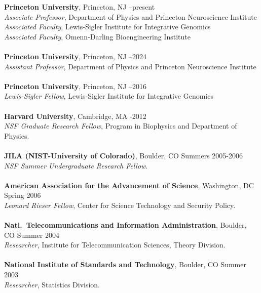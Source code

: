 \documentclass[11pt]{article}
\makeatletter
\renewcommand{\section}{\@startsection
{section}%
{1}%
{0mm}%
{2\baselineskip}%
{0.5\baselineskip}%
{\normalfont\bf\MakeUppercase}} %
\makeatother
\begin{document}
{\bf Princeton University}, Princeton, NJ  --present\\
{\it Associate Professor}, Department of Physics and Princeton
Neuroscience Institute \\
{\it Associated Faculty}, Lewis-Sigler Institute for Integrative Genomics \\ %
{\it Associated Faculty},  Omenn-Darling Bioengineering Institute \\ %
\\
{\bf Princeton University}, Princeton, NJ  --2024\\
{\it Assistant Professor}, Department of Physics and Princeton
Neuroscience Institute \\
\\
{\bf Princeton University}, Princeton, NJ  --2016\\
{\it Lewis-Sigler Fellow}, Lewis-Sigler Institute for Integrative Genomics\\ 
\\
{\bf Harvard University}, 
Cambridge, MA  -2012\\
{\it NSF Graduate Research Fellow}, Program in Biophysics and Department of Physics.\\
\\
{\bf JILA (NIST-University of Colorado)}, Boulder, CO   \dotfill Summers 2005-2006\\
{\it NSF Summer Undergraduate Research Fellow}.\\
\\
{\bf American Association for the Advancement of Science}, Washington, DC  \dotfill Spring 2006\\
{\it Leonard Rieser Fellow}, Center for Science Technology and Security Policy.\\
\\
{\bf Natl.~Telecommunications and Information Administration}, Boulder, CO  \dotfill Summer 2004\\
{\it Researcher}, Institute for Telecommunication Sciences, Theory Division.\\
\\
{\bf National Institute of Standards and Technology}, Boulder, CO  \dotfill Summer 2003\\
{\it Researcher}, Statistics Division.\\
\end{document}
